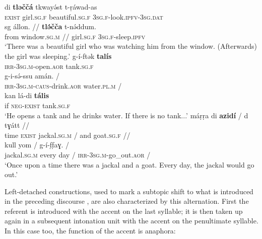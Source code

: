 \documentclass[output=paper]{langsci/langscibook}
\begin{document}
\begin{exe}
\ex\label{5ex:43}
\gll	di	{\textbf{tləččá}}	tkwayə́st	t-ṛáwad-as \\
	{\textsc{exist}}	girl.{\textsc{sg.f}}	beautiful.{\textsc{sg.f}}	{\textsc{3sg.f}}-look.{\textsc{ipfv-3sg.dat}} \\
\glt
\exi{}
\gll	sg	állon.	 //	{\textbf{tlə́čča}}	t-nə́ddum. \\
	from	window.{\textsc{sg.m}}	//	girl.{\textsc{sg.f}}	{\textsc{3sg.f}}-sleep.{\textsc{ipfv}} \\
\glt	`There was a beautiful girl who was watching him from the window. (Afterwards) the girl was sleeping.'
\ex\label{5ex:44}
\gll 	g-í-ftək	{\textbf{talís}} \\
	{\textsc{irr-3sg.m}}-open.{\textsc{aor}}	tank.{\textsc{sg.f}} \\
\glt
\exi{}
\gll	g-i-sə́-ssu	amán.	/ \\
	{\textsc{irr-3sg.m-caus}}-drink.{\textsc{aor}}	water.{\textsc{pl.m}}	/ \\
\glt
\exi{}
\gll	kan	lá-di	{\textbf{tális}} \\
	if	{\textsc{neg-exist}}	tank.{\textsc{sg.f}} \\
\glt	`He opens a tank and he drinks water. If there is no tank...'
\ex\label{5ex:45}
\gll	máṛṛa	di	{\textbf{azidí}}	/	d	tɣátt	// \\
	time	{\textsc{exist}}  jackal.{\textsc{sg.m}}	/	and	goat.{\textsc{sg.f}}	// \\
\glt
\exi{}
	kull	yom	/	g-í-f̣f̣aɣ.	/ \\
	jackal.{\textsc{sg.m}}	every	day	/	{\textsc{irr-3sg.m}}-go\_out.{\textsc{aor}}	/ \\
\glt	`Once upon a time there was a jackal and a goat. Every day, the jackal would go out.'
\end{exe}

Left-detached constructions, used to mark a subtopic shift to what is introduced in the preceding discourse \citep[][278]{mettouchi:schiattarella:18}, are also characterized by this alternation. First the referent is introduced with the accent on the last syllable; it is then taken up again in a subsequent intonation unit with the accent on the penultimate syllable. In this case too, the function of the accent is anaphora:
\end{document}
